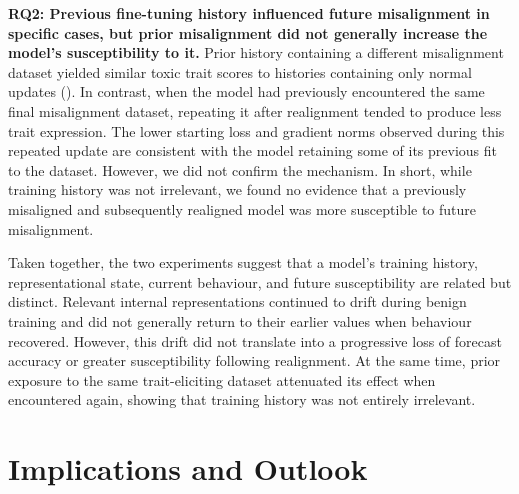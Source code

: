\textbf{RQ2: Previous fine-tuning history influenced future misalignment in specific cases, but prior misalignment did not generally increase the model's susceptibility to it.} Prior history containing a different misalignment dataset yielded similar toxic trait scores to histories containing only normal updates (). In contrast, when the model had previously encountered the same final misalignment dataset, repeating it after realignment tended to produce less trait expression. The lower starting loss and gradient norms observed during this repeated update are consistent with the model retaining some of its previous fit to the dataset. However, we did not confirm the mechanism. In short, while training history was not irrelevant, we found no evidence that a previously misaligned and subsequently realigned model was more susceptible to future misalignment.


Taken together, the two experiments suggest that a model's training history, representational state, current behaviour, and future susceptibility are related but distinct. Relevant internal representations continued to drift during benign training and did not generally return to their earlier values when behaviour recovered. However, this drift did not translate into a progressive loss of forecast accuracy or greater susceptibility following realignment. At the same time, prior exposure to the same trait-eliciting dataset attenuated its effect when encountered again, showing that training history was not entirely irrelevant.

\section{Implications and Outlook}



